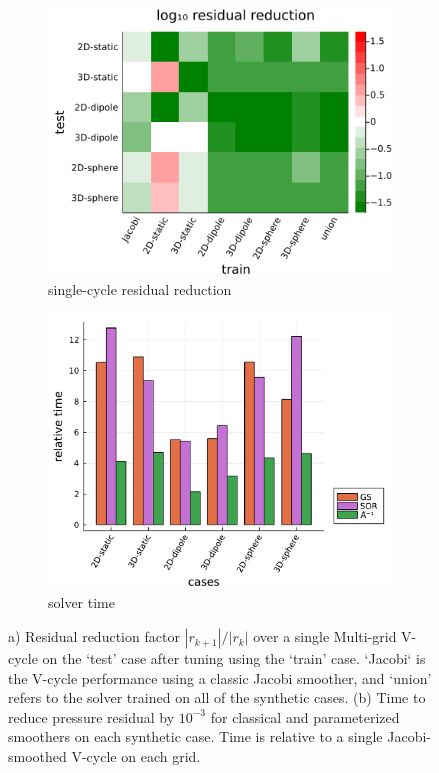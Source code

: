 \documentclass[]{elsarticle}
\begin{document}
\begin{figure}
    \centering
    \begin{subfigure}[b]{0.47\textwidth}
        \centering
        \includegraphics[width=\textwidth]{figures/crossloss.png}
        \caption{single-cycle residual reduction}
        \label{fig:cross plot}
    \end{subfigure}
    \hfill
    \begin{subfigure}[b]{0.5\textwidth}
        \centering
        \includegraphics[width=\textwidth]{figures/synthetic_timing}
        \caption{solver time}
        \label{fig:synthetic time}
    \end{subfigure}
    \caption{a) Residual reduction factor $|r_{k+1}|/|r_k|$ over a single Multi-grid V-cycle on the `test' case after tuning using the `train' case. `Jacobi` is the V-cycle performance using a classic Jacobi smoother, and `union' refers to the solver trained on all of the synthetic cases. (b) Time to reduce pressure residual by $10^{-3}$ for classical and parameterized smoothers on each synthetic case. Time is relative to a single Jacobi-smoothed V-cycle on each grid.}
    \label{fig:synthetic results}
\end{figure}
\end{document}
